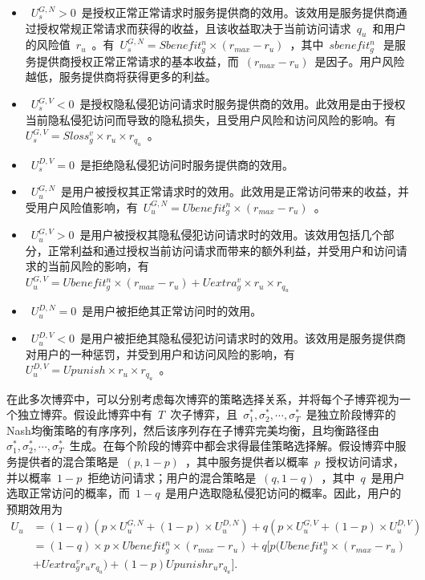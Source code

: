 \begin{itemize}
	\item ~$U_s^{G,N} >0$~是授权正常正常请求时服务提供商的效用。该效用是服务提供商通过授权常规正常请求而获得的收益，且该收益取决于当前访问请求~$q_u$~和用户的风险值~$r_u$~。有~$U_s^{G,N}= Sbenefit_g^n\times (r_{max}-r_u)$~​​，其中~$sbenefit_g^n~$~是服务提供商授权正常正常请求的基本收益，而~$(r_{max}-r_u)$~​​是因子。用户风险越低，服务提供商将获得更多的利益。
	\item ~$U_s^{G,V}<0$~是授权隐私侵犯访问请求时服务提供商的效用。此效用是由于授权当前隐私侵犯访问而导致的隐私损失，且受用户风险和访问风险的影响。有~$U_s^{G,V}= Sloss_g^v \times r_u \times r_{q_u}$~。
	\item ~$U_s^{D,V} = 0$~是拒绝隐私侵犯访问时服务提供商的效用。
	\item ~$U_u^{G,N}$~是用户被授权其正常请求时的效用。此效用是正常访问带来的收益，并受用户风险值影响，有~$U_u^{G,N}= Ubenefit_g^n \times(r_{max} - r_u)$~。
	\item ~$U_u^{G,V} >0$~是用户被授权其隐私侵犯访问请求时的效用。该效用包括几个部分，正常利益和通过授权当前访问请求而带来的额外利益，并受用户和访问请求的当前风险的影响，有~$U_u^{G,V}= Ubenefit_g^n\times(r_{max} - r_u) + Uextra_g^v \times r_u\times r_{q_u}$~
	\item ~$U_u^{D,N} =0$~是用户被拒绝其正常访问时的效用。
	\item ~$U_u^{D,V}<0$~是用户被拒绝其隐私侵犯访问请求时的效用。该效用是服务提供商对用户的一种惩罚，并受到用户和访问风险的影响，有~$U_u^{D,V}= Upunish \times r_u \times r_{q_u}$~。
\end{itemize}

在此多次博弈中，可以分别考虑每次博弈的策略选择关系，并将每个子博弈视为一个独立博弈。假设此博弈中有~$T$~次子博弈，且~$\sigma_1^*, \sigma_2^*, \cdots, \sigma_T^*$~是独立阶段博弈的Nash均衡策略的有序序列，然后该序列存在子博弈完美均衡，且均衡路径由~$\sigma_1^*, \sigma_2^*, \cdots, \sigma_T^*$~生成。在每个阶段的博弈中都会求得最佳策略选择解。假设博弈中服务提供者的混合策略是~$(p,1-p)$~，其中服务提供者以概率~$p$~授权访问请求，并以概率~$1-p$~拒绝访问请求；用户的混合策略是~$(q,1-q)$~，其中{~$q$~}是用户选取正常访问的概率，而~$1-q$~是用户选取隐私侵犯访问的概率。因此，用户的预期效用为
\begin{equation}
\begin{split}
U_u&= (1-q)(p\times U_u^{G,N}+ (1-p)\times U_u^{D,N})+ q(p\times U_u^{G,V}+(1-p)\times U_u^{D,V})\\
&=(1-q)\times p \times Ubenefit_g^n \times(r_{max} - r_u)+ q[p(Ubenefit_g^n\times(r_{max} - r_u) \\
&+ Uextra_g^v r_ur_{q_u})+(1-p)Upunishr_ur_{q_u}].
\end{split}
\end{equation}

